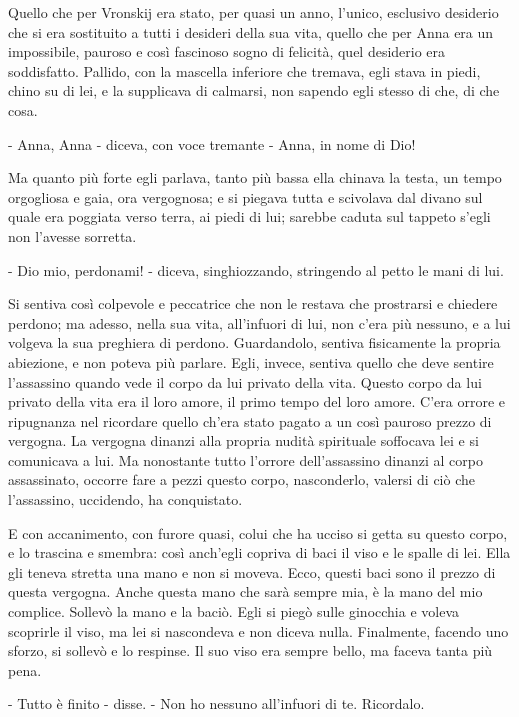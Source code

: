 \label{xi-1} 

Quello che per Vronskij era stato, per quasi un anno, l'unico, esclusivo desiderio che si era sostituito a tutti i desideri della sua vita, quello che per Anna era un impossibile, pauroso e così fascinoso sogno di felicità, quel desiderio era soddisfatto. Pallido, con la mascella inferiore che tremava, egli stava in piedi, chino su di lei, e la supplicava di calmarsi, non sapendo egli stesso di che, di che cosa. 

- Anna, Anna - diceva, con voce tremante - Anna, in nome di Dio! 

Ma quanto più forte egli parlava, tanto più bassa ella chinava la testa, un tempo orgogliosa e gaia, ora vergognosa; e si piegava tutta e scivolava dal divano sul quale era poggiata verso terra, ai piedi di lui; sarebbe caduta sul tappeto s'egli non l'avesse sorretta. 

- Dio mio, perdonami! - diceva, singhiozzando, stringendo al petto le mani di lui. 

Si sentiva così colpevole e peccatrice che non le restava che prostrarsi e chiedere perdono; ma adesso, nella sua vita, all'infuori di lui, non c'era più nessuno, e a lui volgeva la sua preghiera di perdono. Guardandolo, sentiva fisicamente la propria abiezione, e non poteva più parlare. Egli, invece, sentiva quello che deve sentire l'assassino quando vede il corpo da lui privato della vita. Questo corpo da lui privato della vita era il loro amore, il primo tempo del loro amore. C'era orrore e ripugnanza nel ricordare quello ch'era stato pagato a un così pauroso prezzo di vergogna. La vergogna dinanzi alla propria nudità spirituale soffocava lei e si comunicava a lui. Ma nonostante tutto l'orrore dell'assassino dinanzi al corpo assassinato, occorre fare a pezzi questo corpo, nasconderlo, valersi di ciò che l'assassino, uccidendo, ha conquistato. 

E con accanimento, con furore quasi, colui che ha ucciso si getta su questo corpo, e lo trascina e smembra: così anch'egli copriva di baci il viso e le spalle di lei. Ella gli teneva stretta una mano e non si moveva. Ecco, questi baci sono il prezzo di questa vergogna. Anche questa mano che sarà sempre mia, è la mano del mio complice. Sollevò la mano e la baciò. Egli si piegò sulle ginocchia e voleva scoprirle il viso, ma lei si nascondeva e non diceva nulla. Finalmente, facendo uno sforzo, si sollevò e lo respinse. Il suo viso era sempre bello, ma faceva tanta più pena. 

- Tutto è finito - disse. - Non ho nessuno all'infuori di te. Ricordalo. 

